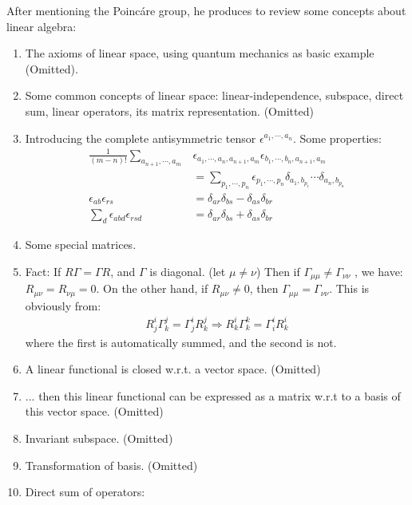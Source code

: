 \documentclass{article}
\numberwithin{equation}{subsection} %
\theoremstyle{definition}
\begin{document}
After mentioning the Poinc\'{a}re group, he produces to review some
concepts about linear algebra:
\begin{enumerate}
    \item The axioms of linear space, using quantum mechanics
        as basic example (Omitted).
    \item Some common concepts of linear space: linear-independence,
        subspace, direct sum, linear operators, its matrix representation. (Omitted)
    \item Introducing the complete antisymmetric tensor 
        $\epsilon^{a_1,\cdots,a_n}$. Some properties:
        \begin{align}
            \frac{1}{(m-n)!} \sum_{a_{n+1},\cdots, a_m}
            & \epsilon_{a_1,\cdots,a_n,a_{n+1},a_m}
            \epsilon_{b_1,\cdots,b_n,a_{n+1},a_m}\nonumber
            \\
            &= \sum_{p_1,\cdots,p_n} 
            \epsilon_{p_1,\cdots,p_n} 
                \delta_{a_1,b_{p_1}}\cdots \delta_{a_n,b_{p_n}}
                \\
            \epsilon_{ab}\epsilon_{rs} &=
                \delta_{ar}\delta_{bs}-\delta_{as}\delta_{br}
                \\
            \sum_d\epsilon_{abd}\epsilon_{rsd} &=
                \delta_{ar}\delta_{bs} + \delta_{as}\delta_{br}
        \end{align}
    \item Some special matrices.
    \item Fact: If $R\Gamma = \Gamma R$, and 
        $\Gamma$ is diagonal. (let $\mu\neq\nu$) Then if 
        $\Gamma_{\mu\mu} \neq \Gamma_{\nu\nu}$ , we have:
        $ R_{\mu\nu}=R_{\nu\mu} = 0 $.
        On the other hand, if $R_{\mu\nu}\neq 0$, then
        $\Gamma_{\mu\mu}=\Gamma_{\nu\nu}$.
        This is obviously from:
        \begin{align*}
            R^{i}_{j}\Gamma^{j}_{k}=\Gamma^{i}_{j} R^{j}_k
            \Longrightarrow
            R^i_k\Gamma^k_k = \Gamma^i_i R^i_k
        \end{align*}
        where the first is automatically summed, and the second is not.

    \item A linear functional is closed w.r.t. a vector space. (Omitted)
    \item ... then this linear functional can be expressed as a
        matrix w.r.t to a basis of this vector space. (Omitted)
    \item Invariant subspace. (Omitted)
    \item Transformation of basis. (Omitted)
    \item Direct sum of operators:


\end{enumerate}
\end{document}
